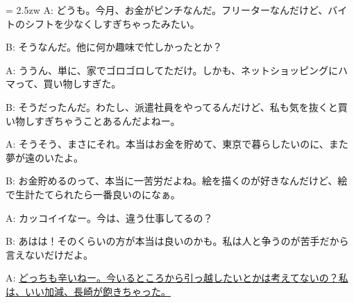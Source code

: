 \documentclass[11pt]{amsart}
\title{}
\author{}
\newenvironment{hangall}[1]{\hangindent = 2.5zw\everypar{\hangindent = 2.5zw}}{}
\begin{document}
\maketitle
\begin{hangall}{}%
A: どうも。今月、お金がピンチなんだ。フリーターなんだけど、バイトのシフトを少なくしすぎちゃったみたい。

B: そうなんだ。他に何か趣味で忙しかったとか？

A: ううん、単に、家でゴロゴロしてただけ。しかも、ネットショッピングにハマって、買い物しすぎた。

B: そうだったんだ。わたし、派遣社員をやってるんだけど、私も気を抜くと買い物しすぎちゃうことあるんだよねー。

A: そうそう、まさにそれ。本当はお金を貯めて、東京で暮らしたいのに、また夢が遠のいたよ。

B: お金貯めるのって、本当に一苦労だよね。絵を描くのが好きなんだけど、絵で生計たてられたら一番良いのになぁ。

A: カッコイイなー。今は、違う仕事してるの？

B: あはは！そのくらいの方が本当は良いのかも。私は人と争うのが苦手だから言えないだけだよ。

A: \ul{どっちも辛いねー。今いるところから引っ越したいとかは考えてないの？私は、いい加減、長崎が飽きちゃった。}\end{hangall}
\end{document}
